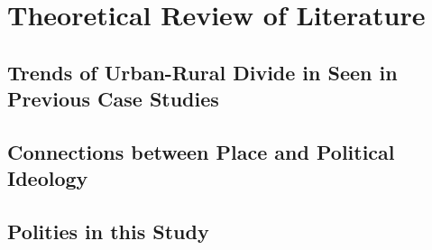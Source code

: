 \documentclass[12pt, titlepage]{article}
\begin{document}
\section{Theoretical Review of Literature}

\subsection{Trends of Urban-Rural Divide in Seen in Previous Case Studies}



\subsection{Connections between Place and Political Ideology}



\subsection{Polities in this Study}
\end{document}
